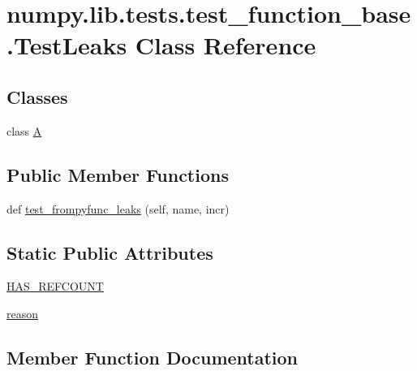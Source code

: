 \hypertarget{classnumpy_1_1lib_1_1tests_1_1test__function__base_1_1TestLeaks}{}\section{numpy.\+lib.\+tests.\+test\+\_\+function\+\_\+base.\+Test\+Leaks Class Reference}
\label{classnumpy_1_1lib_1_1tests_1_1test__function__base_1_1TestLeaks}
\subsection*{Classes}
\begin{DoxyCompactItemize}
\item 
class \hyperlink{classnumpy_1_1lib_1_1tests_1_1test__function__base_1_1TestLeaks_1_1A}{A}
\end{DoxyCompactItemize}
\subsection*{Public Member Functions}
\begin{DoxyCompactItemize}
\item 
def \hyperlink{classnumpy_1_1lib_1_1tests_1_1test__function__base_1_1TestLeaks_a4f23f80c9c9b9998bd21dabaece80cfe}{test\+\_\+frompyfunc\+\_\+leaks} (self, name, incr)
\end{DoxyCompactItemize}
\subsection*{Static Public Attributes}
\begin{DoxyCompactItemize}
\item 
\hyperlink{classnumpy_1_1lib_1_1tests_1_1test__function__base_1_1TestLeaks_a6ef2f714bb7d4874ef6b1a2a39492932}{H\+A\+S\+\_\+\+R\+E\+F\+C\+O\+U\+NT}
\item 
\hyperlink{classnumpy_1_1lib_1_1tests_1_1test__function__base_1_1TestLeaks_a2a359a12558509804cc3be86d47bbe1b}{reason}
\end{DoxyCompactItemize}


\subsection{Member Function Documentation}
\mbox{\label{classnumpy_1_1lib_1_1tests_1_1test__function__base_1_1TestLeaks_a4f23f80c9c9b9998bd21dabaece80cfe}} 
